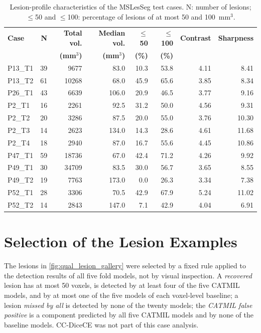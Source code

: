 \begin{table}[H]
\centering
\caption{Lesion-profile characteristics of the MSLesSeg test cases. N:
number of lesions; $\leq$50 and $\leq$100: percentage of lesions of at most
50 and 100~mm$^3$.}
\label{tab:test_case_lesion_profile}
\begin{tabular}{lrrrrrrr}
\toprule
\textbf{Case} & \textbf{N} & \textbf{Total vol.} & \textbf{Median vol.}
& \textbf{$\leq$50} & \textbf{$\leq$100} & \textbf{Contrast} & \textbf{Sharpness} \\
& & \textbf{(mm$^3$)} & \textbf{(mm$^3$)} & \textbf{(\%)} & \textbf{(\%)} & & \\
\midrule
P13\_T1 & 39 & 9677 & 83.0 & 10.3 & 53.8 & 4.11 & 8.41 \\
P13\_T2 & 61 & 10268 & 68.0 & 45.9 & 65.6 & 3.85 & 8.34 \\
P26\_T1 & 43 & 6639 & 106.0 & 20.9 & 46.5 & 3.77 & 9.16 \\
P2\_T1  & 16 & 2261 & 92.5 & 31.2 & 50.0 & 4.56 & 9.31 \\
P2\_T2  & 20 & 3286 & 87.5 & 20.0 & 55.0 & 3.76 & 10.30 \\
P2\_T3  & 14 & 2623 & 134.0 & 14.3 & 28.6 & 4.61 & 11.68 \\
P2\_T4  & 18 & 2940 & 87.0 & 16.7 & 55.6 & 4.45 & 10.86 \\
P47\_T1 & 59 & 18736 & 67.0 & 42.4 & 71.2 & 4.26 & 9.92 \\
P49\_T1 & 30 & 34709 & 83.5 & 30.0 & 56.7 & 3.65 & 8.55 \\
P49\_T2 & 19 & 7763 & 173.0 & 0.0 & 26.3 & 3.34 & 7.38 \\
P52\_T1 & 28 & 3306 & 70.5 & 42.9 & 67.9 & 5.24 & 11.02 \\
P52\_T2 & 14 & 2843 & 147.0 & 7.1 & 42.9 & 4.04 & 6.91 \\
\bottomrule
\end{tabular}
\end{table}

\section{Selection of the Lesion Examples}
\label{appendix:gallery-rule}

The lesions in \cref{fig:qual_lesion_gallery} were selected by a fixed rule
applied to the detection results of all five fold models, not by visual
inspection. A \emph{recovered} lesion has at most 50 voxels, is detected by
at least four of the five CATMIL models, and by at most one of the five
models of each voxel-level baseline; a lesion \emph{missed by all} is
detected by none of the twenty models; the \emph{CATMIL false positive} is
a component predicted by all five CATMIL models and by none of the baseline
models. CC-DiceCE was not part of this case analysis.

